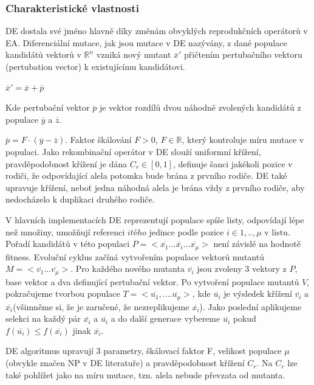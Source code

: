 \subsubsection{Charakteristické vlastnosti}
DE dostala své jméno hlavně díky změnám obvyklých reprodukčních operátorů v EA. Diferenciální mutace, jak jsou mutace v DE nazývány, z dané populace kandidátů vektorů v $\mathbb{R}^n$ vzniká nový mutant $\overline{x}'$ přičtením pertubačního vektoru (pertubation vector) k existujícímu kandidátovi. \par
$\overline{x}'=\overline{x}+\overline{p}$
\par
Kde pertubační vektor $\overline{p}$ je vektor rozdílů dvou náhodně zvolených kandidátů z populace $\overline{y}$ a $\overline{z}$.  \par 
$\overline{p}=F \cdot (\overline{y}-\overline{z})$.
 Faktor škálování $F > 0$, $F \in \mathbb{R}$, který kontroluje míru mutace v populaci. Jako rekombinační operátor v DE slouží uniformní křížení, pravděpodobnost křížení je dána $C_r \in [0,1]$, definuje šanci jakékoli pozice v rodiči, že odpovídající alela potomka bude brána z prvního rodiče. DE také upravuje křížení, neboť jedna náhodná alela je brána vždy z prvního rodiče, aby nedocházelo k duplikaci druhého rodiče. \par 
V hlavních implementacích DE reprezentují populace spíše listy, odpovídají lépe než množiny, umožňují referenci $itého$ jedince podle pozice $i\in{1, .., \mu}$ v listu. Pořadí kandidátů v této populaci $P=<\overline{x_1}...\overline{x_i}...\overline{x_{\mu}}>$ není závislé na hodnotě fitness. Evoluční cyklus začíná vytvořením populace vektorů mutantů $M=<\overline{v_1}...\overline{v_{\mu}}>$. Pro každého nového mutanta $\overline{v_i}$ jsou zvoleny 3 vektory z $P$, base vektor a dva definující pertubační vektor. Po vytvoření populace mutantů $V$, pokračujeme tvorbou populace $T=<\overline{u_1},....\overline{u_{\mu}}>$, kde $\overline{u_i}$ je výsledek křížení $\overline{v_i}$ a $\overline{x_i}$(všimněme si, že je zaručené, že nezreplikujeme $\overline{x_i}$). Jako poslední aplikujeme selekci na každý pár $\overline{x_i}$ a $\overline{u_i}$ a do další generace vybereme $\overline{u_i}$ pokud $f(\overline{u_i}) \leq f(\overline{x_i})$ jinak $\overline{x_i}$. \par 
DE algoritmus upravují 3 parametry, škálovací faktor F, velikost populace $\mu$ (obvykle značen NP v DE literatuře) a pravděpodobnost křížení $C_r$. Na $C_r$ lze také pohlížet jako na míru mutace, tzn. alela nebude převzata od mutanta.\par

